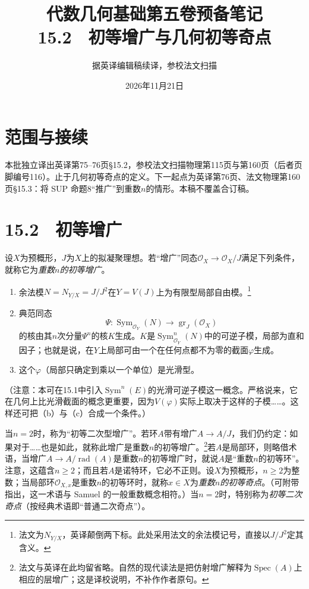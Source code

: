 \documentclass[openany,fontset=fandol]{ctexbook}
\newcommand{\OO}{\mathcal O}
\DeclareMathOperator{\Sym}{Sym}
\DeclareMathOperator{\Spec}{Spec}
\DeclareMathOperator{\gr}{gr}
\begin{document}
\title{代数几何基础第五卷预备笔记\\15.2　初等增广与几何初等奇点}
\author{据英译编辑稿续译，参校法文扫描}
\date{2026年11月21日}
\maketitle
\chapter*{范围与接续}
本批独立译出英译第75--76页§15.2，参校法文扫描物理第115页与第160页（后者页脚编号116）。止于几何初等奇点的定义。下一起点为英译第76页、法文物理第160页§15.3：将 SUP 命题8“推广”到重数$n$的情形。本稿不覆盖合订稿。
\chapter*{15.2　初等增广}
设$X$为预概形，$J$为$X$上的拟凝聚理想。若“增广”同态$\OO_X\to\OO_X/J$满足下列条件，就称它为\emph{重数$n$的初等增广}。
\begin{enumerate}
\item[(a)] 余法模$N=N_{Y/X}=J/J^2$在$Y=V(J)$上为有限型局部自由模。\footnote{法文为$N_{Y/X}$，英译颠倒两下标。此处采用法文的余法模记号，直接以$J/J^2$定其含义。}
\item[(b)] 典范同态
\[
\Psi:\Sym_{\OO_Y}(N)\longrightarrow\gr_J(\OO_X)
\]
的核由其$n$次分量$\Psi^n$的核$K$生成。$K$是$\Sym^n_{\OO_Y}(N)$中的可逆子模，局部为直和因子；也就是说，在$Y$上局部可由一个在任何点都不为零的截面$\varphi$生成。
\item[(c)] 这个$\varphi$（局部只确定到乘以一个单位）是光滑型。
\end{enumerate}
（注意：本可在15.1中引入$\Sym^n(E)$的光滑可逆子模这一概念。严格说来，它在几何上比光滑截面的概念更重要，因为$V(\varphi)$实际上取决于这样的子模……。这样还可把（b）与（c）合成一个条件。）

当$n=2$时，称为“初等二次型增广”。若环$A$带有增广$A\to A/J$，我们仍约定：如果对于……也是如此，就称此增广是重数$n$的初等增广。\footnote{法文与英译在此均留省略。自然的现代读法是把仿射增广解释为$\Spec(A)$上相应的层增广；这是译校说明，不补作作者原句。}若$A$是局部环，则略借术语，当增广$A\to A/\operatorname{rad}(A)$是重数$n$的初等增广时，就说$A$是“重数$n$的初等环”。注意，这蕴含$n\ge2$；而且若$A$是诺特环，它必不正则。设$X$为预概形，$n\ge2$为整数；当局部环$\OO_{X,x}$是重数$n$的初等环时，就称$x\in X$为\emph{重数$n$的初等奇点}。（可附带指出，这一术语与 Samuel 的一般重数概念相符。）当$n=2$时，特别称为\emph{初等二次奇点}（按经典术语即“普通二次奇点”）。
\end{document}
